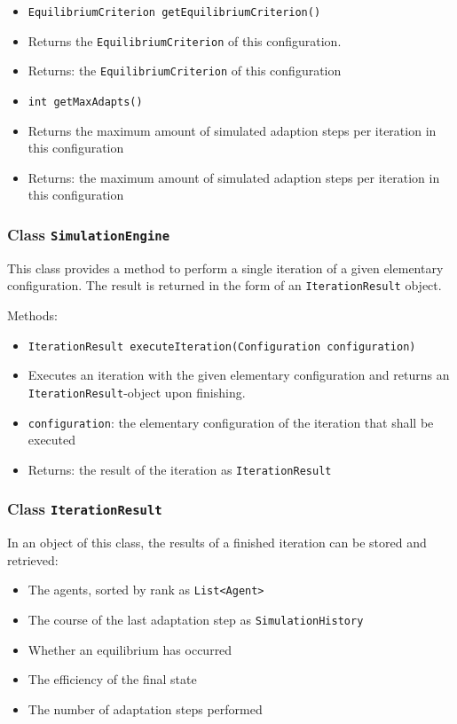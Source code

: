\documentclass[parskip=full,11pt]{scrartcl}
\begin{document}
\begin{itemize}
\item \texttt{EquilibriumCriterion getEquilibriumCriterion()}
\item[] Returns the \texttt{EquilibriumCriterion} of this configuration.
\item[] Returns: the \texttt{EquilibriumCriterion} of this configuration

\item \texttt{int getMaxAdapts()}
\item[] Returns the maximum amount of simulated adaption steps per iteration in this configuration
\item[] Returns: the maximum amount of simulated adaption steps per iteration in this configuration
\end{itemize}

\subsubsection{Class \texttt{SimulationEngine}}
This class provides a method to perform a single iteration of a given elementary configuration. The result is returned in the form of an \texttt{IterationResult} object.

Methods:
\begin{itemize}\itemsep -10pt
\item \texttt{IterationResult executeIteration(Configuration configuration)}
\item[] Executes an iteration with the given elementary configuration and returns an \texttt{IterationResult}-object upon finishing.
\item[] \texttt{configuration}: the elementary configuration of the iteration that shall be executed
\item[] Returns: the result of the iteration as \texttt{IterationResult}
\end{itemize}

\subsubsection{Class \texttt{IterationResult}}
In an object of this class, the results of a finished iteration can be stored and retrieved:
\begin{itemize}\itemsep -10pt
\item The agents, sorted by rank as \texttt{List<Agent>}
\item The course of the last adaptation step as \texttt{SimulationHistory}
\item Whether an equilibrium has occurred
\item The efficiency of the final state
\item The number of adaptation steps performed
\end{itemize}
\end{document}
